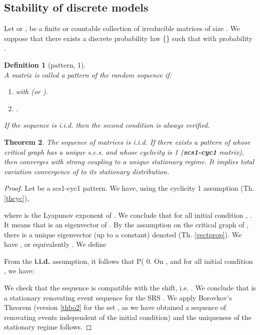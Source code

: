 \documentclass[11pt,titlepage]{article}
\newtheorem{theo}{Theorem }[section]
\newtheorem{defi}[theo]{Definition }
\begin{document}
\subsection{Stability of discrete models}
\label{sse:sdm}
Let  or , be
a finite or countable collection of irreducible 
matrices of size . We suppose that there 
exists a 
discrete probability law \{\} such that  with
probability .  

\begin{defi}[pattern, 1]  \\
\label{de:patt}
A matrix  is called a pattern of the random sequence  if: 
\begin{enumerate}
\item  with
 (or ).
\item .
\end{enumerate}
If the sequence  is i.i.d. then the second condition is always
verified. 
\end{defi}

\begin{theo}
\label{th1}
The sequence of matrices  is i.i.d. 
If there exists a pattern of  whose critical graph has a unique
s.c.s. and whose cyclicity is 1 ({\bf scs1-cyc1} matrix), then 
 converges with strong coupling 
to a unique stationary regime. It implies total variation
convergence of  to its stationary distribution.
\end{theo}


\begin {proof}
Let  
be a scs1-cyc1 pattern. We have,
using the cyclicity 1 
assumption  (Th. \ref{thcyc}), 

where  is the Lyapunov exponent of .
We conclude that for all initial condition , . It means that  is an eigenvector of . By the
assumption on the 
critical graph of , there is a unique eigenvector (up to a constant)
denoted  (Th. \ref{vectprop}).  We have
, or equivalently
. We define  

From the {\bf i.i.d.} assumption, it follows
that P( 0. On , and for all initial condition ,
we have:
 
We check that the sequence  is compatible
with the shift, i.e. . We conclude that
 is a stationary renovating 
event 
sequence for the SRS . We apply Borovkov's Theorem
(version 
\ref{thbo2} for the set , 
as we have obtained a sequence of renovating
events independent 
of the initial condition) and the uniqueness of
the stationary regime follows. 
\end {proof} 
\end{document}
